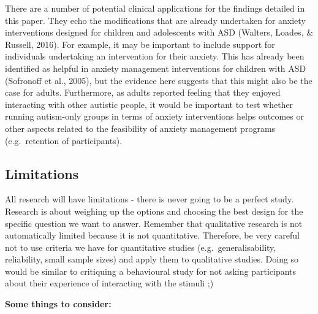\documentclass[
  english,
  letterpaper,
  DIV=11,
  numbers=noendperiod]{scrreprt}
\begin{document}
\begin{tcolorbox}[enhanced jigsaw, breakable, bottomtitle=1mm, leftrule=.75mm, opacityback=0, colbacktitle=quarto-callout-note-color!10!white, opacitybacktitle=0.6, toprule=.15mm, colback=white, left=2mm, coltitle=black, bottomrule=.15mm, titlerule=0mm, title={Study 2: Robertson et al., 2018}, toptitle=1mm, colframe=quarto-callout-note-color-frame, arc=.35mm, rightrule=.15mm]

There are a number of potential clinical applications for the findings
detailed in this paper. They echo the modifications that are already
undertaken for anxiety interventions designed for children and
adolescents with ASD (Walters, Loades, \& Russell, 2016). For example,
it may be important to include support for individuals undertaking an
intervention for their anxiety. This has already been identified as
helpful in anxiety management interventions for children with ASD
(Sofronoff et al., 2005), but the evidence here suggests that this might
also be the case for adults. Furthermore, as adults reported feeling
that they enjoyed interacting with other autistic people, it would be
important to test whether running autism-only groups in terms of anxiety
interventions helps outcomes or other aspects related to the feasibility
of anxiety management programs (e.g.~retention of participants).

\end{tcolorbox}

\subsection{Limitations}\label{limitations}

All research will have limitations - there is never going to be a
perfect study. Research is about weighing up the options and choosing
the best design for the specific question we want to answer. Remember
that qualitative research is not automatically limited because it is not
quantitative. Therefore, be very careful not to use criteria we have for
quantitative studies (e.g.~generalisability, reliability, small sample
sizes) and apply them to qualitative studies. Doing so would be similar
to critiquing a behavioural study for not asking participants about
their experience of interacting with the stimuli ;)

\textbf{Some things to consider:}
\end{document}
